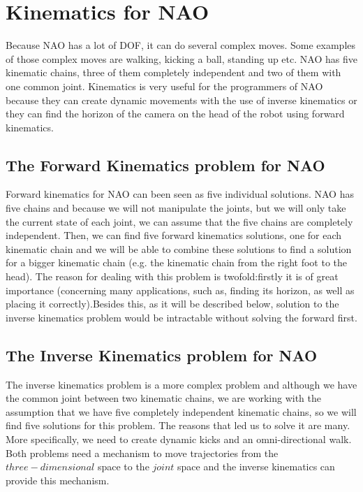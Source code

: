 \newpage
\section{Kinematics for NAO}
Because NAO has a lot of DOF, it can do several complex moves. Some examples of those complex moves are walking, kicking a ball, standing up etc. NAO has five kinematic chains, three of them completely independent and two of them with one common joint. Kinematics is very useful for the programmers of NAO because they can create dynamic movements with the use of inverse kinematics or they can find the horizon of the camera on the head of the robot using forward kinematics.
\subsection{The Forward Kinematics problem for NAO}
Forward kinematics for NAO can been seen as five individual solutions. NAO has five chains and because we will not manipulate the joints, but we will only take the current state of each joint, we can assume that the five chains are completely independent. Then, we can find five forward kinematics solutions, one for each kinematic chain and we will be able to combine these solutions to find a solution for a bigger kinematic chain (e.g. the kinematic chain from the right foot to the head). The reason for dealing with this problem is twofold:firstly it is of great importance (concerning many applications, such as, finding its horizon, as well as placing it correctly).Besides this, as it will be described below, solution to the inverse kinematics problem would be intractable without solving the forward first.

\subsection{The Inverse Kinematics problem for NAO}
The inverse kinematics problem is a more complex problem and although we have the common joint between two kinematic chains, we are working with the assumption that we have five completely independent kinematic chains, so we will find five solutions for this problem. The reasons that led us to solve it are many. More specifically, we need to create dynamic kicks and an omni-directional walk. Both problems need a mechanism to move trajectories from the \(three-dimensional\) space to the \(joint\) space and the inverse kinematics can provide this mechanism.
